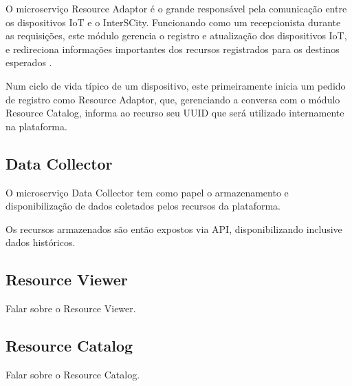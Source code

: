 O microserviço Resource Adaptor é o grande responsável pela comunicação entre
os dispositivos IoT e o InterSCity. Funcionando como um recepcionista durante
as requisições, este módulo gerencia o registro e atualização dos dispositivos
IoT, e redireciona informações importantes dos recursos registrados para os
destinos esperados \cite{delesposte2017}.

Num ciclo de vida típico de um dispositivo, este primeiramente inicia um
pedido de registro como Resource Adaptor, que, gerenciando a conversa com o
módulo Resource Catalog, informa ao recurso seu UUID que será utilizado
internamente na plataforma.

\subsection{Data Collector}

O microserviço Data Collector tem como papel o armazenamento e disponibilização
de dados coletados pelos recursos da plataforma\cite{delesposte2017}.

Os recursos armazenados são então expostos via API, disponibilizando
inclusive dados históricos.

\subsection{Resource Viewer}
Falar sobre o Resource Viewer.

\subsection{Resource Catalog}
Falar sobre o Resource Catalog.
